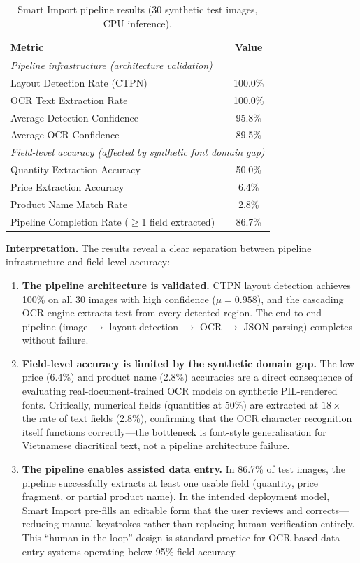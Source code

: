 \documentclass[11pt,a4paper]{report}
\begin{document}
\begin{table}[H]
\centering
\caption{Smart Import pipeline results (30 synthetic test images, CPU inference).}
\label{tab:pillar1}
\small
\begin{tabular}{lc}
\toprule
\textbf{Metric} & \textbf{Value} \\
\midrule
\multicolumn{2}{l}{\emph{Pipeline infrastructure (architecture validation)}} \\
Layout Detection Rate (CTPN)        & 100.0\% \\
OCR Text Extraction Rate            & 100.0\% \\
Average Detection Confidence        & 95.8\% \\
Average OCR Confidence              & 89.5\% \\
\midrule
\multicolumn{2}{l}{\emph{Field-level accuracy (affected by synthetic font domain gap)}} \\
Quantity Extraction Accuracy        & 50.0\% \\
Price Extraction Accuracy           & 6.4\% \\
Product Name Match Rate             & 2.8\% \\
Pipeline Completion Rate ($\geq$1 field extracted) & 86.7\% \\
\bottomrule
\end{tabular}
\end{table}

\textbf{Interpretation.} The results reveal a clear separation between pipeline infrastructure and field-level accuracy:

\begin{enumerate}
  \item \textbf{The pipeline architecture is validated.} CTPN layout detection achieves 100\% on all 30 images with high confidence ($\mu = 0.958$), and the cascading OCR engine extracts text from every detected region. The end-to-end pipeline (image $\to$ layout detection $\to$ OCR $\to$ JSON parsing) completes without failure.
  \item \textbf{Field-level accuracy is limited by the synthetic domain gap.} The low price (6.4\%) and product name (2.8\%) accuracies are a direct consequence of evaluating real-document-trained OCR models on synthetic PIL-rendered fonts. Critically, numerical fields (quantities at 50\%) are extracted at $18\times$ the rate of text fields (2.8\%), confirming that the OCR character recognition itself functions correctly---the bottleneck is font-style generalisation for Vietnamese diacritical text, not a pipeline architecture failure.
  \item \textbf{The pipeline enables assisted data entry.} In 86.7\% of test images, the pipeline successfully extracts at least one usable field (quantity, price fragment, or partial product name). In the intended deployment model, Smart Import pre-fills an editable form that the user reviews and corrects---reducing manual keystrokes rather than replacing human verification entirely. This ``human-in-the-loop'' design is standard practice for OCR-based data entry systems operating below 95\% field accuracy.
\end{enumerate}
\end{document}
